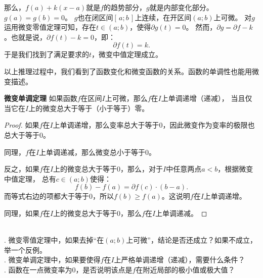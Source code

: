\documentclass[12pt,UTF8,fontset=none]{ctexbook}
\begin{document}
那么，$f(a) + k(x - a)$就是$f$的趋势部分，$g$就是内部变化部分。$g(a) = g(b) = 0$。
$g$也在闭区间$[\,a; b\,]$上连续，在开区间$(a; b)$上可微。
对$g$运用微变零值定理可知，存在$t\in(a;b)$，使得$\partial g(t) = 0$。
然而，$\partial g = \partial f - k$。也就是说，$ \partial f(t) - k = 0$，即：
$$ \partial f(t) = k.$$
于是我们找到了满足要求的$t$，微变中值定理成立。

以上推理过程中，我们看到了函数变化和微变函数的关系。函数的单调性也能用微变描述。
\begin{tm}{\textbf{微变单调定理}}\label{tm:2-4-20}
    如果函数$f$在区间$I$上可微，那么$f$在$I$上单调递增（递减），
    当且仅当它在$I$上的微变总大于等于（小于等于）零。
\end{tm}

\begin{proof}
    如果$f$在$I$上单调递增，那么变率总大于等于$0$，因此微变作为变率的极限也总大于等于$0$。
    
    同理，$f$在$I$上单调递减，那么微变总小于等于$0$。

    反之，如果$f$在$I$上的微变总大于等于$0$，那么，对于$I$中任意两点$a < b$，根据微变中值定理，
    总有$c\in(a; b)$使得：
    $$f(b) - f(a) = \partial f(c) \cdot (b - a).$$
    而等式右边的项都大于等于$0$，所以$f(b) \geqslant f(a)$。这说明$f$在$I$上单调递增。
    
    同理，如果$f$在$I$上的微变总大于等于$0$，那么$f$在$I$上单调递减。
\end{proof}

\begin{sk}
    \mbox{} \\
    . 微变零值定理中，如果去掉“在$(a; b)$上可微”，结论是否还成立？如果不成立，举一个反例。\\
    . 微变单调定理中，如果要使得$f$在$I$上严格单调递增（递减），需要什么条件？\\
    . 函数在一点微变率为$0$，是否说明该点是$f$在附近局部的极小值或极大值？
\end{sk}
\end{document}
